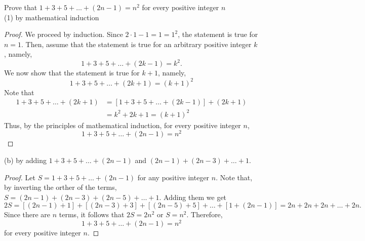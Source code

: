 \documentclass[12pt]{article}
\newenvironment{problem}[2][Problem]{\begin{trivlist}
		\item[\hskip \labelsep {\bfseries #1}\hskip \labelsep {\bfseries #2.}]}{\end{trivlist}}
\begin{document}
	\begin{problem}{4}
		Prove that $1+3+5+\ldots+(2n-1)=n^{2}$ for every positive integer $n$\\
		
		(1) by mathematical induction 
		\begin{proof}
			We proceed by induction. Since $2\cdot 1 -1 = 1 = 1^{2}$, the statement is true for $n=1$. Then, assume that the statement is true for an arbitrary positive integer $k$, namely,
			\begin{equation*}
				1+3+5+\ldots+(2k-1) = k^{2}.
			\end{equation*}
		We now show that the statement is true for $k+1$, namely,
		\begin{equation*}
			1+3+5+\ldots+(2k+1) = (k+1)^{2} 
		\end{equation*}
	Note that
	\begin{align*}
		1+3+5+\ldots+(2k+1) &= [1+3+5+\ldots+(2k-1)]+(2k+1)\\
		&= k^{2}+2k+1 = (k+1)^{2}
	\end{align*}
Thus, by the principles of mathematical induction, for every positive integer $n$, 
\begin{equation*}
	1+3+5+\ldots +(2n-1) = n^{2}
\end{equation*}
		\end{proof}
	(b) by adding $1+3+5+\ldots+(2n-1)$ and $(2n-1)+(2n-3)+\ldots+1$.
	\begin{proof}
		Let $S=1+3+5+\ldots+(2n-1)$ for any positive integer $n$. Note that, by inverting the orther of the terms, $S=(2n-1)+(2n-3)+(2n-5)+\ldots+1$. Adding them we get
		\begin{equation*}
			2S = [(2n-1)+1]+ [(2n-3)+3]+[(2n-5)+5]+\ldots+[1+(2n-1)] = 2n+2n+2n+\ldots+2n.
		\end{equation*}
	Since there are $n$ terms, it follows that $2S=2n^{2}$ or $S=n^{2}$. Therefore, 
	\begin{equation*}
		1+3+5+\ldots+(2n-1)=n^{2}
	\end{equation*}
	for every positive integer $n$.
	\end{proof}
	\end{problem}
 
\end{document}
